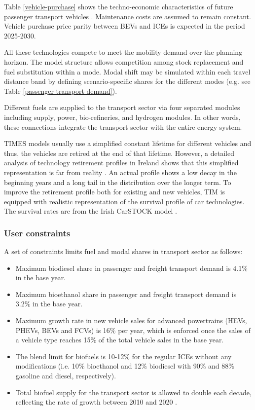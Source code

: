 \documentclass[gmd,manuscript]{copernicus}
\begin{document}
Table \ref{vehicle-purchase} shows the techno-economic characteristics of future passenger transport vehicles \citep{Mulholland2017,Helgeson2020}. Maintenance costs are assumed to remain constant. Vehicle purchase price parity between BEVs and ICEs is expected in the period 2025-2030. 

All these technologies compete to meet the mobility demand over the planning horizon. The model structure allows competition among stock replacement and fuel substitution within a mode. Modal shift may be simulated within each travel distance band by defining scenario-specific shares for the different modes (e.g. see Table \ref{passenger transport demand}). 

Different fuels are supplied to the transport sector via four separated modules including supply, power, bio-refineries, and hydrogen modules. In other words, these connections integrate the transport sector with the entire energy system.

TIMES models usually use a simplified constant lifetime for different vehicles and thus, the vehicles are retired at the end of that lifetime. However, a detailed analysis of technology retirement profiles in Ireland shows that this simplified representation is far from reality \citep{Mulholland2018}. An actual profile shows a low decay in the beginning years and a long tail in the distribution over the longer term. To improve the retirement profile both for existing and new vehicles, TIM is equipped with realistic representation of the survival profile of car technologies. The survival rates are from the Irish CarSTOCK model \citep{daly2011modelling, Mulholland2018}. 

\subsubsection{User constraints}

A set of constraints limits fuel and modal shares in transport sector as follows: 
\begin{itemize}
 \item Maximum biodiesel share in passenger and freight transport demand is 4.1\% in the base year.
 \item Maximum bioethanol share in passenger and freight transport demand is 3.2\% in the base year.
 \item Maximum growth rate in new vehicle sales for advanced powertrains (HEVs, PHEVs, BEVs and FCVs) is 16\% per year, which is enforced once the sales of a vehicle type reaches 15\% of the total vehicle sales in the base year.
 \item The blend limit for biofuels is 10-12\% for the regular ICEs without any modifications (i.e. 10\% bioethanol and 12\% biodiesel with 90\% and 88\% gasoline and diesel, respectively). 
 \item Total biofuel supply for the transport sector is allowed to double each decade, reflecting the rate of growth between 2010 and 2020 \citep{NORA2019}. 
\end{itemize}
\end{document}
